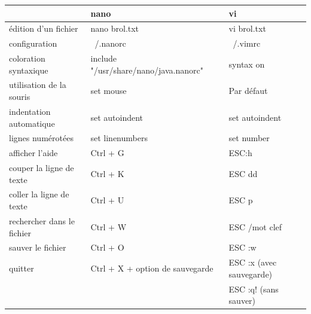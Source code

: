 \documentclass[a4paper,11pt]{style-esi/td}
\begin{document}
\begin{tabular}{|l|l|l|}
	\hline
	                           & nano                                  & vi                       \\
	\hline\hline
	édition d’un fichier       & nano brol.txt                         & vi brol.txt              \\
	configuration              & ~/.nanorc                             & ~/.vimrc                 \\
	coloration syntaxique      & include "/usr/share/nano/java.nanorc" & syntax on                \\
	utilisation de la souris   & set mouse                             & Par défaut               \\
	indentation automatique    & set autoindent                        & set autoindent           \\
	lignes numérotées          & set linenumbers                       & set number               \\
	afficher l'aide            & Ctrl + G                              & ESC:h                    \\
	couper la ligne de texte   & Ctrl + K                              & ESC dd                   \\
	coller la ligne de texte   & Ctrl + U                              & ESC p                    \\
	rechercher dans le fichier & Ctrl + W                              & ESC /mot clef            \\
	sauver le fichier          & Ctrl + O                              & ESC :w                   \\
	quitter                    & Ctrl + X + option de sauvegarde       & ESC :x (avec sauvegarde) \\
	                           &                                       & ESC :q! (sans sauver)    \\
	\hline
\end{tabular}
\end{document}

